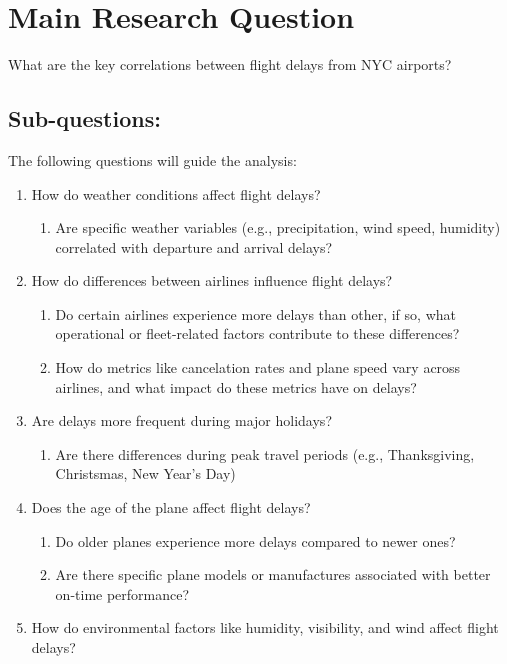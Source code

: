 \documentclass[
  10pt,
  letterpaper,
  DIV=11,
  numbers=noendperiod]{scrartcl}
\providecommand{\tightlist}{%
  \setlength{\itemsep}{0pt}\setlength{\parskip}{0pt}}\usepackage{longtable,booktabs,array}
\begin{document}
\section{Main Research Question}\label{main-research-question}

What are the key correlations between flight delays from NYC airports?

\subsection{Sub-questions:}\label{sub-questions}

The following questions will guide the analysis:

\begin{enumerate}
\def\labelenumi{\arabic{enumi}.}
\tightlist
\item
  How do weather conditions affect flight delays?

  \begin{enumerate}
  \def\labelenumii{\alph{enumii}.}
  \tightlist
  \item
    Are specific weather variables (e.g., precipitation, wind speed,
    humidity) correlated with departure and arrival delays?
  \end{enumerate}
\item
  How do differences between airlines influence flight delays?

  \begin{enumerate}
  \def\labelenumii{\alph{enumii}.}
  \tightlist
  \item
    Do certain airlines experience more delays than other, if so, what
    operational or fleet-related factors contribute to these
    differences?
  \item
    How do metrics like cancelation rates and plane speed vary across
    airlines, and what impact do these metrics have on delays?
  \end{enumerate}
\item
  Are delays more frequent during major holidays?

  \begin{enumerate}
  \def\labelenumii{\alph{enumii}.}
  \tightlist
  \item
    Are there differences during peak travel periods (e.g.,
    Thanksgiving, Christsmas, New Year's Day)
  \end{enumerate}
\item
  Does the age of the plane affect flight delays?

  \begin{enumerate}
  \def\labelenumii{\alph{enumii}.}
  \tightlist
  \item
    Do older planes experience more delays compared to newer ones?
  \item
    Are there specific plane models or manufactures associated with
    better on-time performance?
  \end{enumerate}
\item
  How do environmental factors like humidity, visibility, and wind
  affect flight delays?


\end{enumerate}
\end{document}
